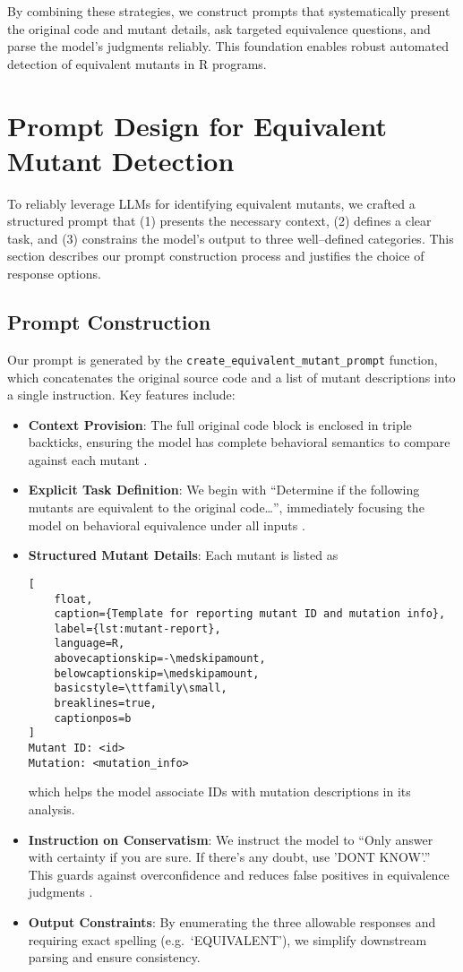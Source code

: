 By combining these strategies, we construct prompts that systematically present the original code and mutant details, ask targeted equivalence questions, and parse the model’s judgments reliably. This foundation enables robust automated detection of equivalent mutants in R programs.  

\section{Prompt Design for Equivalent Mutant Detection}

To reliably leverage LLMs for identifying equivalent mutants, we crafted a structured prompt that (1) presents the necessary context, (2) defines a clear task, and (3) constrains the model’s output to three well–defined categories.  This section describes our prompt construction process and justifies the choice of response options.

\subsection{Prompt Construction}

Our prompt is generated by the \texttt{create\_equivalent\_mutant\_prompt} function, which concatenates the original source code and a list of mutant descriptions into a single instruction.  Key features include:
\begin{itemize}
  \item \textbf{Context Provision}: The full original code block is enclosed in triple backticks, ensuring the model has complete behavioral semantics to compare against each mutant \cite{openai2023api}.
  \item \textbf{Explicit Task Definition}: We begin with “Determine if the following mutants are equivalent to the original code…”, immediately focusing the model on behavioral equivalence under all inputs \cite{liu2021pre}.
  \item \textbf{Structured Mutant Details}: Each mutant is listed as
  \begin{lstlisting}[
    float,
    caption={Template for reporting mutant ID and mutation info},
    label={lst:mutant-report},
    language=R,
    abovecaptionskip=-\medskipamount,
    belowcaptionskip=\medskipamount,
    basicstyle=\ttfamily\small,
    breaklines=true,
    captionpos=b
]
Mutant ID: <id>
Mutation: <mutation_info>
\end{lstlisting}

  which helps the model associate IDs with mutation descriptions in its analysis.
  \item \textbf{Instruction on Conservatism}: We instruct the model to “Only answer with certainty if you are sure. If there's any doubt, use 'DONT KNOW'.”  This guards against overconfidence and reduces false positives in equivalence judgments \cite{wei2022chain}.
  \item \textbf{Output Constraints}: By enumerating the three allowable responses and requiring exact spelling (e.g.\ ‘EQUIVALENT’), we simplify downstream parsing and ensure consistency.
\end{itemize}

